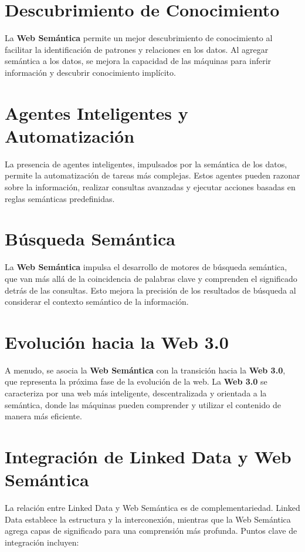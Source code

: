 \documentclass[11pt]{report}
\begin{document}
	\section{Descubrimiento de Conocimiento}

	La \textbf{Web Semántica} permite un mejor descubrimiento de conocimiento al facilitar la identificación de patrones y relaciones en los datos. Al agregar semántica a los datos, se mejora la capacidad de las máquinas para inferir información y descubrir conocimiento implícito.

	\section{Agentes Inteligentes y Automatización}

	La presencia de agentes inteligentes, impulsados por la semántica de los datos, permite la automatización de tareas más complejas. Estos agentes pueden razonar sobre la información, realizar consultas avanzadas y ejecutar acciones basadas en reglas semánticas predefinidas.

	\section{Búsqueda Semántica}

	La \textbf{Web Semántica} impulsa el desarrollo de motores de búsqueda semántica, que van más allá de la coincidencia de palabras clave y comprenden el significado detrás de las consultas. Esto mejora la precisión de los resultados de búsqueda al considerar el contexto semántico de la información.

	\section{Evolución hacia la Web 3.0}

	A menudo, se asocia la \textbf{Web Semántica} con la transición hacia la \textbf{Web 3.0}, que representa la próxima fase de la evolución de la web. La \textbf{Web 3.0} se caracteriza por una web más inteligente, descentralizada y orientada a la semántica, donde las máquinas pueden comprender y utilizar el contenido de manera más eficiente.

	\section*{Integración de Linked Data y Web Semántica}
	
	La relación entre Linked Data y Web Semántica es de complementariedad. Linked Data establece la estructura y la interconexión, mientras que la Web Semántica agrega capas de significado para una comprensión más profunda. Puntos clave de integración incluyen:
	
\end{document}
